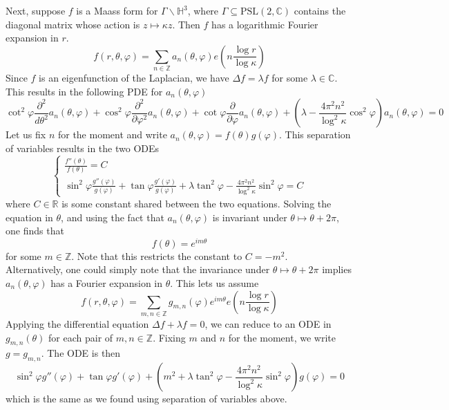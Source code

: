 \documentclass[]{article}
\begin{document}
Next, suppose $f$ is a Maass form for $\Gamma\backslash\mathbb{H}^3$, where $\Gamma \subseteq \text{PSL}(2, \mathbb{C})$ contains the diagonal matrix whose action is $z \mapsto \kappa z$.
Then $f$ has a logarithmic Fourier expansion in $r$.
$$
f(r, \theta, \varphi) =
\sum_{n \in \mathbb{Z}}a_n(\theta, \varphi)e\left(n\frac{\log r}{\log\kappa}\right)
$$
Since $f$ is an eigenfunction of the Laplacian, we have $\Delta f = \lambda f$ for some $\lambda \in \mathbb{C}$.
This results in the following PDE for $a_n(\theta, \varphi)$
$$
\cot^2\varphi\frac{\partial^2}{d\theta^2}a_n(\theta, \varphi) + \cos^2\varphi\frac{\partial^2}{\partial\varphi^2}a_n(\theta, \varphi) + \cot\varphi\frac{\partial}{\partial\varphi}a_n(\theta, \varphi) + \left( \lambda - \frac{4\pi^2n^2}{\log^2\kappa}\cos^2\varphi \right)a_n(\theta, \varphi) = 0
$$
Let us fix $n$ for the moment and write $a_n(\theta, \varphi) = f(\theta)g(\varphi)$.
This separation of variables results in the two ODEs
$$
\begin{cases}
\frac{f''(\theta)}{f(\theta)} = C \\
\sin^2\varphi\frac{g''(\varphi)}{g(\varphi)} + \tan\varphi\frac{g'(\varphi)}{g(\varphi)} + \lambda\tan^2\varphi - \frac{4\pi^2n^2}{\log^2\kappa}\sin^2\varphi = C
\end{cases}
$$
where $C \in \mathbb{R}$ is some constant shared between the two equations.
Solving the equation in $\theta$, and using the fact that $a_n(\theta, \varphi)$ is invariant under $\theta \mapsto \theta + 2\pi$, one finds that
$$
f(\theta) = e^{im\theta}
$$
for some $m \in \mathbb{Z}$.
Note that this restricts the constant to $C = -m^2$.
\\

Alternatively, one could simply note that the invariance under $\theta \mapsto \theta + 2\pi$ implies $a_n(\theta, \varphi)$ has a Fourier expansion in $\theta$.
This lets us assume
$$
f(r, \theta, \varphi) = \sum_{m, n \in \mathbb{Z}}g_{m, n}(\varphi)e^{im\theta}e\left(n\frac{\log r}{\log\kappa}\right)
$$
Applying the differential equation $\Delta f + \lambda f = 0$, we can reduce to an ODE in $g_{m, n}(\theta)$ for each pair of $m, n \in \mathbb{Z}$.
Fixing $m$ and $n$ for the moment, we write $g = g_{m,n}$.
The ODE is then
\begin{equation}\label{gODE}
\sin^2\varphi g''(\varphi) + \tan\varphi g'(\varphi) + \left(m^2 + \lambda\tan^2\varphi - \frac{4\pi^2n^2}{\log^2\kappa}\sin^2\varphi\right)g(\varphi) = 0
\end{equation}
which is the same as we found using separation of variables above.
\\
\end{document}
